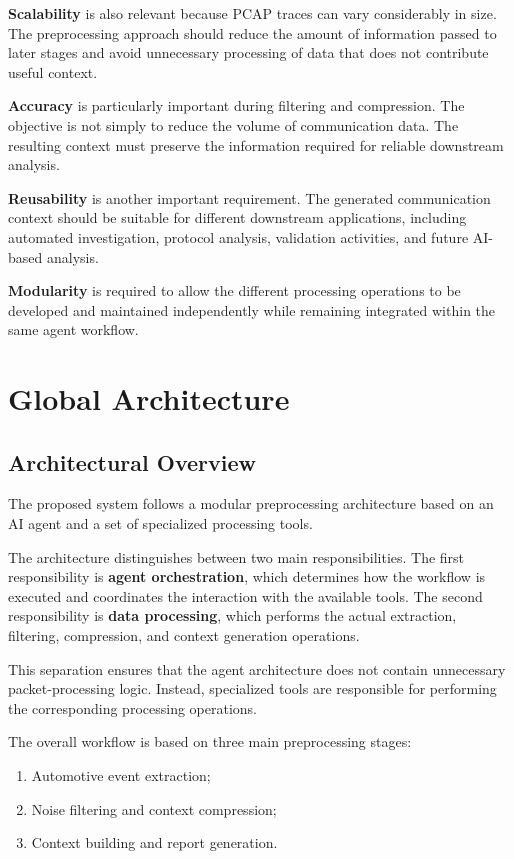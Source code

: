 \textbf{Scalability} is also relevant because PCAP traces can vary considerably in size. The preprocessing approach should reduce the amount of information passed to later stages and avoid unnecessary processing of data that does not contribute useful context.

\textbf{Accuracy} is particularly important during filtering and compression. The objective is not simply to reduce the volume of communication data. The resulting context must preserve the information required for reliable downstream analysis.

\textbf{Reusability} is another important requirement. The generated communication context should be suitable for different downstream applications, including automated investigation, protocol analysis, validation activities, and future AI-based analysis.

\textbf{Modularity} is required to allow the different processing operations to be developed and maintained independently while remaining integrated within the same agent workflow.

\section{Global Architecture}

\subsection{Architectural Overview}

The proposed system follows a modular preprocessing architecture based on an AI agent and a set of specialized processing tools.

The architecture distinguishes between two main responsibilities. The first responsibility is \textbf{agent orchestration}, which determines how the workflow is executed and coordinates the interaction with the available tools. The second responsibility is \textbf{data processing}, which performs the actual extraction, filtering, compression, and context generation operations.

This separation ensures that the agent architecture does not contain unnecessary packet-processing logic. Instead, specialized tools are responsible for performing the corresponding processing operations.

The overall workflow is based on three main preprocessing stages:

\begin{enumerate}
    \item Automotive event extraction;
    \item Noise filtering and context compression;
    \item Context building and report generation.
\end{enumerate}

